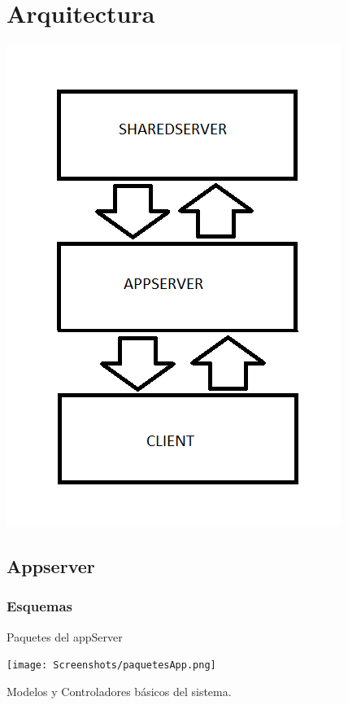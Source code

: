 \documentclass[letterpaper,10pt,english]{sphinxmanual}
\begin{document}
\section{Arquitectura}
\label{manuals:arquitectura}
\includegraphics{architecture.png}


\subsection{Appserver}
\label{manuals:appserver}

\subsubsection{Esquemas}
\label{manuals:esquemas}
Paquetes del appServer

\texttt{[image: Screenshots/paquetesApp.png]}

Modelos y Controladores básicos del sistema.
\end{document}
